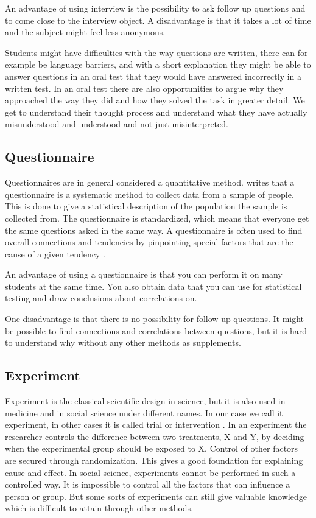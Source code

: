 \bigskip\noindent
An advantage of using interview is the possibility to ask follow up questions and to come close to the interview object.
A disadvantage is that it takes a lot of time and the subject might feel less anonymous.

\bigskip\noindent
Students might have difficulties with the way questions are written, there can for example be language barriers, and with a short explanation they might be able to answer questions in an oral test that they would have answered incorrectly in a written test. In an oral test there are also opportunities to argue why they approached the way they did and how they solved the task in greater detail. We get to understand their thought process and understand what they have actually misunderstood and understood and not just misinterpreted.  

\subsection*{Questionnaire}
Questionnaires are in general considered a quantitative method.  writes that a questionnaire is a systematic method to collect data from a sample of people. This is done to give a statistical description of the population the sample is collected from. The questionnaire is standardized, which means that everyone get the same questions asked in the same way. A questionnaire is often used to find overall connections and tendencies by pinpointing special factors that are the cause of a given tendency \cite{tjora2012kvalitative}. 

\bigskip\noindent
An advantage of using a questionnaire is that you can perform it on many students at the same time. You also obtain data that you can use for statistical testing and draw conclusions about correlations on. 

\bigskip\noindent
One disadvantage is that there is no possibility for follow up questions. It might be possible to find connections and correlations between questions, but it is hard to understand why without any other methods as supplements.

\subsection*{Experiment}
Experiment is the classical scientific design in science, but it is also used in medicine and in social science under different names. In our case we call it experiment, in other cases it is called trial or intervention \cite{ringdal2001enhet}. In an experiment the researcher controls the difference between two treatments, X and Y, by deciding when the experimental group should be exposed to X. Control of other factors are secured through randomization. This gives a good foundation for explaining cause and effect. In social science, experiments cannot be performed in such a controlled way. It is impossible to control all the factors that can influence a person or group. But some sorts of experiments can still give valuable knowledge which is difficult to attain through other methods.

